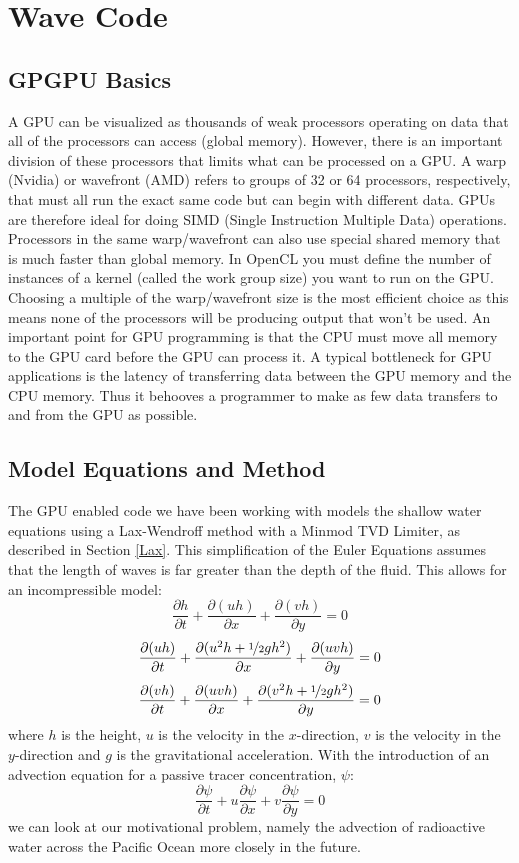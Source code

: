 \section{Wave Code}
\label{WaveCode}
\subsection{GPGPU Basics}
A GPU can be visualized as thousands of weak processors operating on data that all of the processors can access (global memory). However, there is an important division of these processors that limits what can be processed on a GPU. A warp (Nvidia) or wavefront (AMD) refers to groups of 32 or 64 processors, respectively, that must all run the exact same code but can begin with different data.  GPUs are therefore ideal for doing SIMD (Single Instruction Multiple Data) operations. Processors in the same warp/wavefront can also use special shared memory that is much faster than global memory. In OpenCL you must define the number of instances of a kernel (called the work group size) you want to run on the GPU. Choosing a multiple of the warp/wavefront size is the most efficient choice as this means none of the processors will be producing output that won't be used.
An important point for GPU programming is that the CPU must move all memory to the GPU card before the GPU can process it. A typical bottleneck for GPU applications is the latency of transferring data between the GPU memory and the CPU memory. Thus it behooves a programmer to make as few data transfers to and from the GPU as possible.
\subsection{Model Equations and Method}
The GPU enabled code we have been working with models the shallow water equations using a Lax-Wendroff method with a Minmod TVD Limiter, as described in Section \ref{Lax}. This simplification of the Euler Equations assumes that the length of waves is far greater than the depth of the fluid. This allows for an incompressible model:
\[
\frac{\partial h}{\partial t} + \frac{\partial(uh)}{\partial x} + \frac{\partial(vh)}{\partial y} = 0
\] \[
\frac{\partial (uh)}{\partial t} + \frac{\partial(u^2h+\nicefrac{1}{2} g h^2)}{\partial x} + \frac{\partial(uvh)}{\partial y} = 0
\] \[
\frac{\partial (vh)}{\partial t} + \frac{\partial(uvh)}{\partial x}+ \frac{\partial(v^2h+\nicefrac{1}{2} g h^2)}{\partial y}  = 0
\]
where $h$ is the height, $u$ is the velocity in the $x$-direction, $v$ is the velocity in the $y$-direction and $g$ is the gravitational acceleration. With the introduction of an advection equation for a passive tracer concentration, $\psi$:
\[
\frac{\partial \psi}{\partial t} + u\frac{\partial \psi}{\partial x} + v\frac{\partial \psi}{\partial y} = 0
\]
we can look at our motivational problem, namely the advection of radioactive water across the Pacific Ocean more closely in the future.